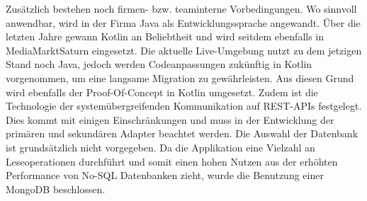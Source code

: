 Zusätzlich bestehen noch firmen- bzw. teaminterne Vorbedingungen. Wo sinnvoll anwendbar, wird in der Firma Java als Entwicklungssprache angewandt. Über die letzten Jahre gewann Kotlin an Beliebtheit und wird seitdem ebenfalls in MediaMarktSaturn eingesetzt. Die aktuelle Live-Umgebung nutzt zu dem jetzigen Stand noch Java, jedoch werden Codeanpassungen zukünftig in Kotlin vorgenommen, um eine langsame Migration zu gewährleisten. Aus diesen Grund wird ebenfalls der Proof-Of-Concept in Kotlin umgesetzt. Zudem ist die Technologie der systemübergreifenden Kommunikation auf REST-APIs festgelegt. Dies kommt mit einigen Einschränkungen und muss in der Entwicklung der primären und sekundären Adapter beachtet werden. Die Auswahl der Datenbank ist grundsätzlich nicht vorgegeben. Da die Applikation eine Vielzahl an Leseoperationen durchführt und somit einen hohen Nutzen aus der erhöhten Performance von No-SQL Datenbanken zieht, wurde die Benutzung einer MongoDB beschlossen.
